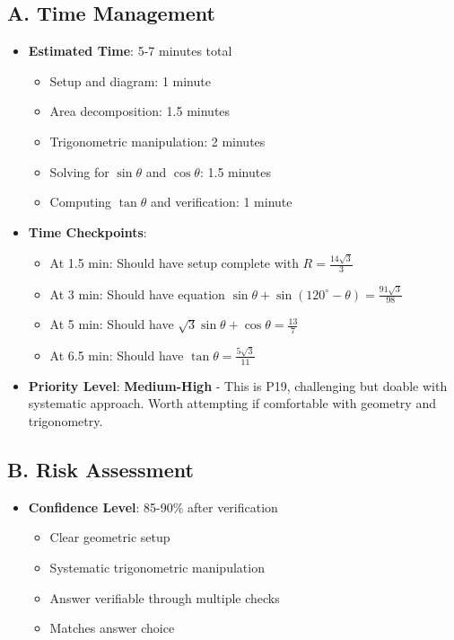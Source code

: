 \documentclass[12pt]{article}
\begin{document}
\begin{competitionbox}
\subsection*{A. Time Management}
\begin{itemize}[leftmargin=*]
    \item \textbf{Estimated Time}: 5-7 minutes total
    \begin{itemize}
        \item Setup and diagram: 1 minute
        \item Area decomposition: 1.5 minutes
        \item Trigonometric manipulation: 2 minutes
        \item Solving for $\sin\theta$ and $\cos\theta$: 1.5 minutes
        \item Computing $\tan\theta$ and verification: 1 minute
    \end{itemize}
    
    \item \textbf{Time Checkpoints}: 
    \begin{itemize}
        \item At 1.5 min: Should have setup complete with $R = \frac{14\sqrt{3}}{3}$
        \item At 3 min: Should have equation $\sin\theta + \sin(120^{\circ} - \theta) = \frac{91\sqrt{3}}{98}$
        \item At 5 min: Should have $\sqrt{3}\sin\theta + \cos\theta = \frac{13}{7}$
        \item At 6.5 min: Should have $\tan\theta = \frac{5\sqrt{3}}{11}$
    \end{itemize}
    
    \item \textbf{Priority Level}: \textbf{Medium-High} - This is P19, challenging but doable with systematic approach. Worth attempting if comfortable with geometry and trigonometry.
\end{itemize}

\subsection*{B. Risk Assessment}
\begin{itemize}[leftmargin=*]
    \item \textbf{Confidence Level}: 85-90\% after verification
    \begin{itemize}
        \item Clear geometric setup
        \item Systematic trigonometric manipulation
        \item Answer verifiable through multiple checks
        \item Matches answer choice
    \end{itemize}
    

\end{itemize}
\end{competitionbox}
\end{document}
